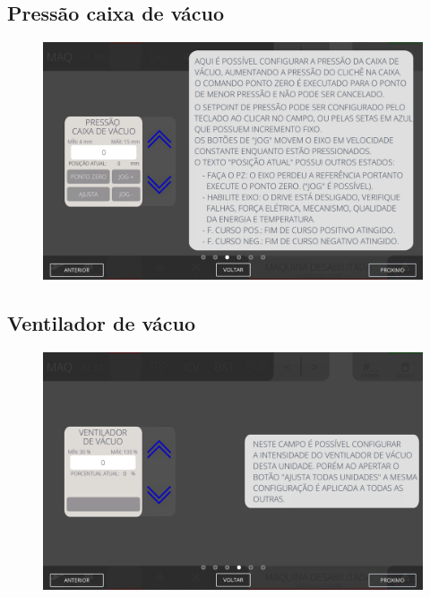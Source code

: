 \newpage
\thispagestyle{fancy}
\vspace{\fill}
\subsection{Pressão caixa de vácuo}
\begin{figure}
    \centering
    \includegraphics[width=576 px,height=360 px]{src/imagesICV/04-printters/02-printter/settings/e-3.png}
\end{figure}
\newpage

\thispagestyle{fancy}
\vspace{\fill}
\subsection{Ventilador de vácuo}
\begin{figure}
    \centering
    \includegraphics[width=576 px,height=360 px]{src/imagesICV/04-printters/02-printter/settings/e-4.png}
\end{figure}

